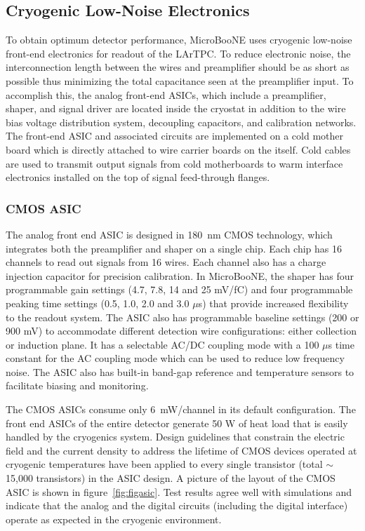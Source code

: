 \subsection{Cryogenic Low-Noise Electronics}
\label{sec:coldelectronics}
To obtain optimum detector performance, MicroBooNE uses cryogenic low-noise front-end electronics for readout of the LArTPC. To reduce electronic noise, the interconnection length between the \lartpc wires and preamplifier should be as short as possible thus minimizing the total capacitance seen at the preamplifier input. To accomplish this, the analog front-end ASICs, which include a preamplifier, shaper, and signal driver are located inside the cryostat in addition to the wire bias voltage distribution system, decoupling capacitors, and calibration networks. The front-end ASIC and associated circuits are implemented on a cold mother board which is directly attached to wire carrier boards on the \lartpc itself. Cold cables are used to transmit output signals from cold motherboards to warm interface electronics installed on the top of signal feed-through flanges.

\subsubsection{CMOS ASIC}

The analog front end ASIC is designed in 180~nm CMOS technology, which integrates both the preamplifier and shaper on a single chip. Each chip has 16 channels to read out signals from 16 wires. Each channel also has a charge injection capacitor for precision calibration. In MicroBooNE, the shaper has four programmable gain settings (4.7, 7.8, 14 and 25 mV/fC) and four programmable peaking time settings (0.5, 1.0, 2.0 and 3.0 $\mu$s) that provide increased flexibility to the readout system. The ASIC also has programmable baseline settings (200 or 900 mV) to accommodate different detection wire configurations: either collection or induction plane. It has a selectable AC/DC coupling mode with a 100 $\mu$s time constant for the AC coupling mode which can be used to reduce low frequency noise. The ASIC also has built-in band-gap reference and temperature sensors to facilitate biasing and monitoring.

The CMOS ASICs consume only 6~mW/channel in its default configuration. The front end ASICs of the entire detector generate 50 W of heat load that is easily handled by the cryogenics system. Design guidelines that constrain the electric field and the current density to address the lifetime of CMOS devices operated at cryogenic temperatures have been applied to every single transistor (total $\sim$15,000 transistors) in the ASIC design. A picture of the layout of the CMOS ASIC is shown in figure~\ref{fig:figasic}. Test results agree well with simulations and indicate that the analog and the digital circuits (including the digital interface) operate as expected in the cryogenic environment. 

